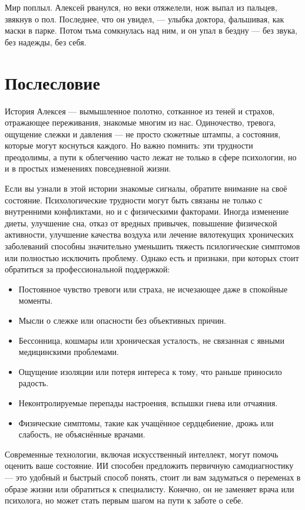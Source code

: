 \documentclass[12pt,a4paper]{book}
\begin{document}
Мир поплыл. Алексей рванулся, но веки отяжелели, нож выпал из пальцев, звякнув о пол. Последнее, что он увидел, — улыбка доктора, фальшивая, как маски в парке. Потом тьма сомкнулась над ним, и он упал в бездну — без звука, без надежды, без себя.

\chapter*{Послесловие}

История Алексея — вымышленное полотно, сотканное из теней и страхов, отражающее переживания, знакомые многим из нас. Одиночество, тревога, ощущение слежки и давления — не просто сюжетные штампы, а состояния, которые могут коснуться каждого. Но важно помнить: эти трудности преодолимы, а пути к облегчению часто лежат не только в сфере психологии, но и в простых изменениях повседневной жизни.

Если вы узнали в этой истории знакомые сигналы, обратите внимание на своё состояние. Психологические трудности могут быть связаны не только с внутренними конфликтами, но и с физическими факторами. Иногда изменение диеты, улучшение сна, отказ от вредных привычек, повышение физической активности, улучшение качества воздуха или лечение вялотекущих хронических заболеваний способны значительно уменьшить тяжесть псилогические симптомов или полностью исключить проблему. Однако есть и признаки, при которых стоит обратиться за профессиональной поддержкой:

\begin{itemize}
\item Постоянное чувство тревоги или страха, не исчезающее даже в спокойные моменты.
\item Мысли о слежке или опасности без объективных причин.
\item Бессонница, кошмары или хроническая усталость, не связанная с явными медицинскими проблемами.
\item Ощущение изоляции или потеря интереса к тому, что раньше приносило радость.
\item Неконтролируемые перепады настроения, вспышки гнева или отчаяния.
\item Физические симптомы, такие как учащённое сердцебиение, дрожь или слабость, не объяснённые врачами.
\end{itemize}

Современные технологии, включая искусственный интеллект, могут помочь оценить ваше состояние. ИИ способен предложить первичную самодиагностику — это удобный и быстрый способ понять, стоит ли вам задуматься о переменах в образе жизни или обратиться к специалисту. Конечно, он не заменяет врача или психолога, но может стать первым шагом на пути к заботе о себе.
\end{document}
